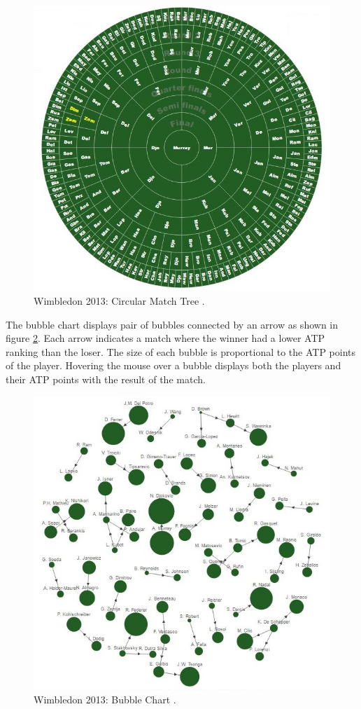 \documentclass[9pt,twocolumn,twoside]{styles/osajnl}
\begin{document}
\begin{figure}[h]
\centering
\includegraphics[scale=0.4]{images/1}
\centering
\caption{Wimbledon 2013: Circular Match Tree \cite{www-cmt}.}
\label{fig:circular tree}
\end{figure}

The bubble chart displays pair of bubbles connected by an arrow as shown in figure \ref{fig:bubble chart}. Each arrow indicates a match where the winner had a lower ATP ranking than the loser. The size of each bubble is proportional to the ATP points of the player. Hovering the mouse over a bubble displays both the players and their ATP points with the result of the match. 

\begin{figure}[h]
\centering
\includegraphics[scale=0.5]{images/2}
\centering
\caption{Wimbledon 2013: Bubble Chart \cite{www-bubble}.}
\label{fig:bubble chart}
\end{figure}
\end{document}
